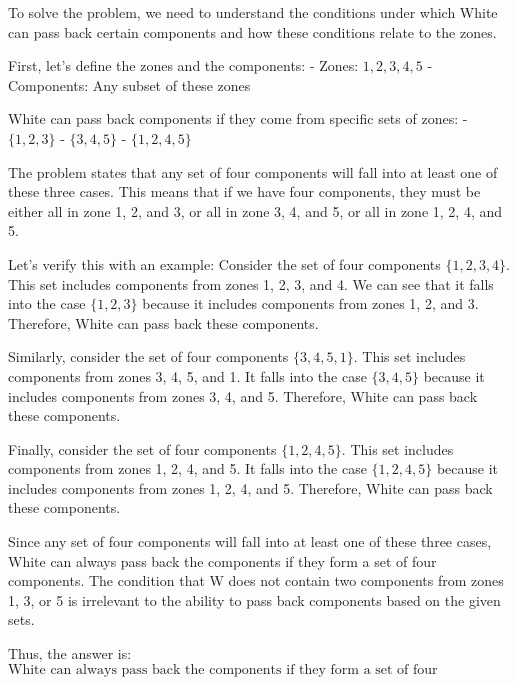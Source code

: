 To solve the problem, we need to understand the conditions under which White can pass back certain components and how these conditions relate to the zones.

First, let's define the zones and the components:
- Zones: \(1, 2, 3, 4, 5\)
- Components: Any subset of these zones

White can pass back components if they come from specific sets of zones:
- \(\{1, 2, 3\}\)
- \(\{3, 4, 5\}\)
- \(\{1, 2, 4, 5\}\)

The problem states that any set of four components will fall into at least one of these three cases. This means that if we have four components, they must be either all in zone 1, 2, and 3, or all in zone 3, 4, and 5, or all in zone 1, 2, 4, and 5.

Let's verify this with an example:
Consider the set of four components \(\{1, 2, 3, 4\}\). This set includes components from zones 1, 2, 3, and 4. We can see that it falls into the case \(\{1, 2, 3\}\) because it includes components from zones 1, 2, and 3. Therefore, White can pass back these components.

Similarly, consider the set of four components \(\{3, 4, 5, 1\}\). This set includes components from zones 3, 4, 5, and 1. It falls into the case \(\{3, 4, 5\}\) because it includes components from zones 3, 4, and 5. Therefore, White can pass back these components.

Finally, consider the set of four components \(\{1, 2, 4, 5\}\). This set includes components from zones 1, 2, 4, and 5. It falls into the case \(\{1, 2, 4, 5\}\) because it includes components from zones 1, 2, 4, and 5. Therefore, White can pass back these components.

Since any set of four components will fall into at least one of these three cases, White can always pass back the components if they form a set of four components. The condition that W does not contain two components from zones 1, 3, or 5 is irrelevant to the ability to pass back components based on the given sets.

Thus, the answer is:
\[
\boxed{\text{White can always pass back the components if they form a set of four components.}}
\]